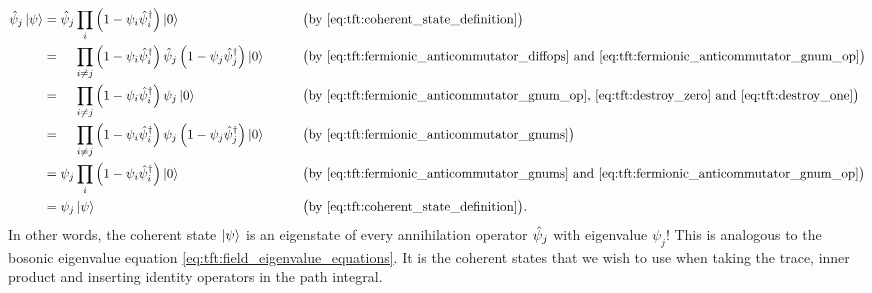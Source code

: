 \begin{equation}
\begin{aligned}
	\destr_j \ket{\psi} &= \destr_j \prod_i \left( 1 - \psi_i \creat_i \right) \ket{0} && \qquad \big( \text{by \eqref{eq:tft:coherent_state_definition}} \big) \\
	                    &= \phantom{\destr_j} \prod_{i \neq j} \left( 1 - \psi_i \creat_i \right) \destr_j \left( 1 - \psi_j \creat_j \right) \ket{0} && \qquad \big( \text{by \eqref{eq:tft:fermionic_anticommutator_diffops} and \eqref{eq:tft:fermionic_anticommutator_gnum_op}} \big) \\
	                    &= \phantom{\destr_j} \prod_{i \neq j} \left( 1 - \psi_i \creat_i \right) \psi_j \ket{0} && \qquad \big( \text{by \eqref{eq:tft:fermionic_anticommutator_gnum_op}, \eqref{eq:tft:destroy_zero} and \eqref{eq:tft:destroy_one}} \big) \\
	                    &= \phantom{\destr_j} \prod_{i \neq j} \left( 1 - \psi_i \creat_i \right) \psi_j \left( 1 - \psi_j \creat_j \right) \ket{0}   && \qquad \big( \text{by \eqref{eq:tft:fermionic_anticommutator_gnums}} \big) \\
                    	&= \psi_j \prod_i \left( 1 - \psi_i \creat_i \right) \ket{0} && \qquad \big( \text{by \eqref{eq:tft:fermionic_anticommutator_gnums} and \eqref{eq:tft:fermionic_anticommutator_gnum_op}} \big) \\
	                    &= \psi_j \ket{\psi} && \qquad \big( \text{by \eqref{eq:tft:coherent_state_definition}} \big) .
\end{aligned}
\label{eq:tft:coherent_state_eigenvalue}
\end{equation}
In other words, the coherent state $\ket{\psi}$ is an eigenstate of every annihilation operator $\hat\psi_j$ with eigenvalue $\psi_j$!
This is analogous to the bosonic eigenvalue equation \eqref{eq:tft:field_eigenvalue_equations}.
It is the coherent states that we wish to use when taking the trace, inner product and inserting identity operators in the path integral.

